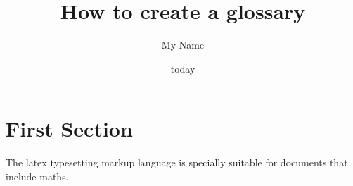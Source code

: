 \documentclass{article}
\title{How to create a glossary}
\author{My Name}
\date{today}
\begin{document}
\maketitle
\newpage

\tableofcontents
\clearpage

\section{First Section}
The \Gls{latex} typesetting markup language is specially suitable
for documents that include \gls{maths}.

\clearpage

\printglossaries
\end{document}
